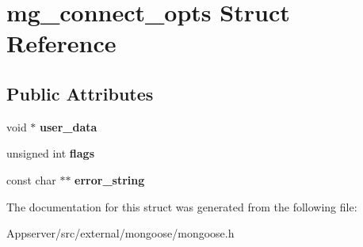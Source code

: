 \hypertarget{structmg__connect__opts}{}\section{mg\+\_\+connect\+\_\+opts Struct Reference}
\label{structmg__connect__opts}
\subsection*{Public Attributes}
\begin{DoxyCompactItemize}
\item 
void $\ast$ {\bfseries user\+\_\+data}\hypertarget{structmg__connect__opts_a88039c409267c457638a0ebce97d7c5c}{}\label{structmg__connect__opts_a88039c409267c457638a0ebce97d7c5c}

\item 
unsigned int {\bfseries flags}\hypertarget{structmg__connect__opts_a794f93a8213aa29cdb59fb42075c0ab0}{}\label{structmg__connect__opts_a794f93a8213aa29cdb59fb42075c0ab0}

\item 
const char $\ast$$\ast$ {\bfseries error\+\_\+string}\hypertarget{structmg__connect__opts_a24fa9723e785487ed74b779c1e30ce75}{}\label{structmg__connect__opts_a24fa9723e785487ed74b779c1e30ce75}

\end{DoxyCompactItemize}


The documentation for this struct was generated from the following file\+:\begin{DoxyCompactItemize}
\item 
Appserver/src/external/mongoose/mongoose.\+h\end{DoxyCompactItemize}
